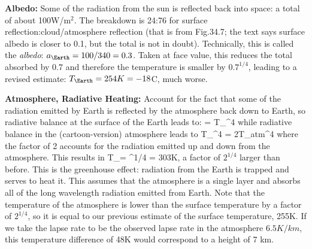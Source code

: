 \documentclass[11pt]{book}
\begin{document}
\bei
\item {\bf Albedo:} Some of the radiation from the sun is reflected back into space: a total of about 100W/m$^2$. The breakdown is 24:76 for surface reflection:cloud/atmosphere reflection (that is from Fig.34.7; the text says surface albedo is closer to 0.1, but the total is not in doubt). Technically, this is called the {\it albedo}: $a_\Earth=100/340=0.3$. Taken at face value, this reduces the total absorbed by $0.7$ and therefore the temperature is smaller by $0.7^{1/4}$, leading to a revised estimate: $T_\Earth=254K=-18$C, much worse.
\item
{\bf Atmosphere, Radiative Heating:} Account for the fact that some of the radiation emitted by Earth is reflected by the atmosphere back down to Earth, so radiative balance at the surface of the Earth leads to:
\be
= %
\sigma T_\Earth^4
\ee
while radiative balance in the (cartoon-version) atmosphere leads to
\be
T_\Earth^4 = 2T_{atm}^4
\ee
where the factor of 2 accounts for the radiation emitted up and down from the atmosphere. This results in
\be
T_\Earth = ^{1/4} = 303K,
\ee
a factor of $2^{1/4}$ larger than before. 
This is the greenhouse effect: radiation from the Earth is trapped and serves to heat it. This assumes that the atmosphere is a single layer and absorbs all of the long wavelength radiation emitted from Earth.
Note that the temperature of the atmosphere is lower than the surface temperature by a factor of $2^{1/4}$, so it is equal to our previous estimate of the surface temperature, 255K. If we take the lapse rate to be the observed lapse rate in the atmosphere $6.5K/km$, this temperature difference of 48K would correspond to a height of 7 km.
\eei
%
\end{document}
